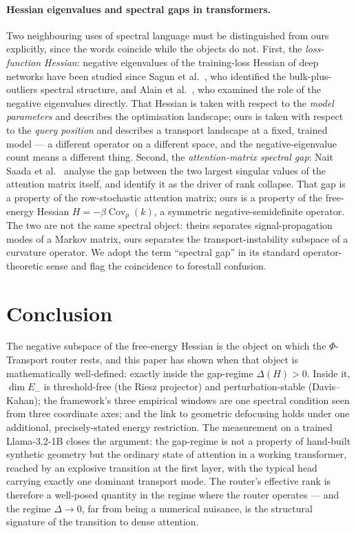 \documentclass[11pt]{article}
\theoremstyle{plain}
\theoremstyle{definition}
\begin{document}
\paragraph{Hessian eigenvalues and spectral gaps in transformers.}
Two neighbouring uses of spectral language must be distinguished from ours
explicitly, since the words coincide while the objects do not. First, the
\emph{loss-function Hessian}: negative eigenvalues of the training-loss
Hessian of deep networks have been studied since
Sagun et al.~\cite{sagun2016eigenvalues}, who identified the
bulk-plus-outliers spectral structure, and Alain et
al.~\cite{alain2019negative}, who examined the role of the negative
eigenvalues directly. That Hessian is taken with respect to the
\emph{model parameters} and describes the optimisation landscape; ours is
taken with respect to the \emph{query position} and describes a transport
landscape at a fixed, trained model --- a different operator on a different
space, and the negative-eigenvalue count means a different thing. Second,
the \emph{attention-matrix spectral gap}: Nait Saada et
al.~\cite{naitsaada2025mindthegap} analyse the gap between the two largest
singular values of the attention matrix itself, and identify it as the
driver of rank collapse. That gap is a property of the row-stochastic
attention matrix; ours is a property of the free-energy Hessian
$H=-\beta\operatorname{Cov}_p(k)$, a symmetric negative-semidefinite
operator. The two are not the same spectral object: theirs separates
signal-propagation modes of a Markov matrix, ours separates the
transport-instability subspace of a curvature operator. We adopt the term
``spectral gap'' in its standard operator-theoretic sense and flag the
coincidence to forestall confusion.

\section{Conclusion}
\label{sec:conclusion}

The negative subspace of the free-energy Hessian is the object on which
the $\Phi$-Transport router rests, and this paper has shown when that
object is mathematically well-defined: exactly inside the gap-regime
$\Delta(H)>0$. Inside it, $\dim E_-$ is threshold-free (the Riesz
projector) and perturbation-stable (Davis--Kahan); the framework's three
empirical windows are one spectral condition seen from three coordinate
axes; and the link to geometric defocusing holds under one additional,
precisely-stated energy restriction. The measurement on a trained
Llama-3.2-1B closes the argument: the gap-regime is not a property of
hand-built synthetic geometry but the ordinary state of attention in a
working transformer, reached by an explosive transition at the first
layer, with the typical head carrying exactly one dominant transport
mode. The router's effective rank is therefore a well-posed quantity in
the regime where the router operates --- and the regime $\Delta\to0$, far
from being a numerical nuisance, is the structural signature of the
transition to dense attention.



\end{document}

